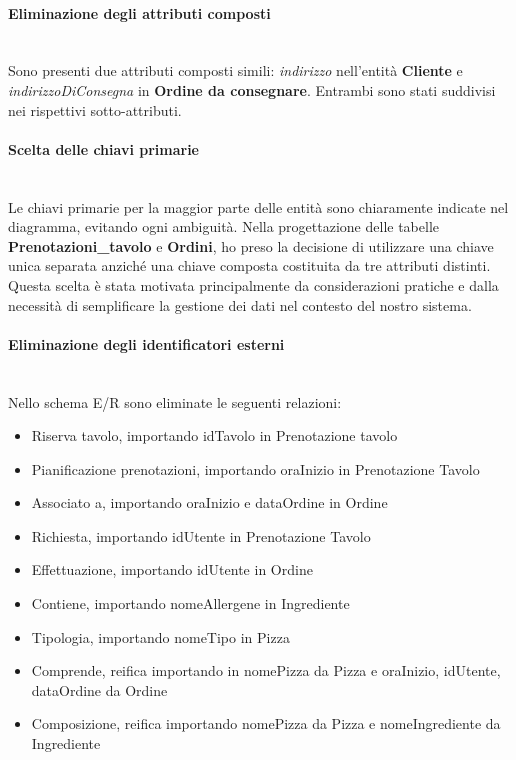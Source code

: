 \documentclass[a4paper,12pt, oneside]{article}
\begin{document}
\paragraph{Eliminazione degli attributi composti}
\hphantom{A}\\    %
Sono presenti due attributi composti simili: \textit{indirizzo}
nell'entità \textbf{Cliente} e \textit{indirizzoDiConsegna} in
\textbf{Ordine da consegnare}. Entrambi sono stati suddivisi
nei rispettivi sotto-attributi.

\paragraph{Scelta delle chiavi primarie}
\hphantom{A}\\    %
Le chiavi primarie per la maggior parte delle entità sono
chiaramente indicate nel diagramma, evitando ogni ambiguità.
Nella progettazione delle tabelle
\textbf{Prenotazioni\_tavolo} e \textbf{Ordini}, ho preso la
decisione di utilizzare una chiave unica separata anziché una
chiave composta costituita da tre attributi distinti. Questa
scelta è stata motivata principalmente da considerazioni
pratiche e dalla necessità di semplificare la gestione dei
dati nel contesto del nostro sistema.

\paragraph{Eliminazione degli identificatori esterni}
\hphantom{A}\\    %
Nello schema E/R sono eliminate le seguenti relazioni:
\begin{itemize}
    \item Riserva tavolo, importando idTavolo in Prenotazione tavolo
    \item Pianificazione prenotazioni, importando oraInizio in Prenotazione Tavolo
    \item Associato a, importando oraInizio e dataOrdine in Ordine
    \item Richiesta, importando idUtente in Prenotazione Tavolo
    \item Effettuazione, importando idUtente in Ordine
    \item Contiene, importando nomeAllergene in Ingrediente
    \item Tipologia, importando nomeTipo in Pizza
    \item Comprende, reifica importando in nomePizza da Pizza e oraInizio, idUtente, dataOrdine da Ordine
    \item Composizione, reifica importando nomePizza da Pizza e nomeIngrediente da Ingrediente
\end{itemize}
\end{document}
